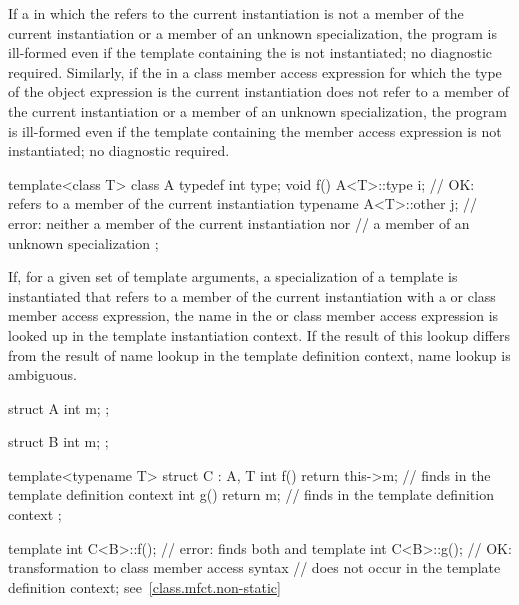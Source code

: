 \pnum
If a  in which the 
refers to the current instantiation is not a member of the current instantiation
or a member of an unknown specialization, the program is ill-formed even if the
template containing the  is not instantiated; no
diagnostic required. Similarly, if the  in a class
member access expression for which the type of the object expression is the
current instantiation does not refer to a member of the current instantiation
or a member of an unknown specialization, the program is ill-formed even if the
template containing the member access expression is not instantiated; no diagnostic
required. \begin{example}
\begin{codeblock}
template<class T> class A {
  typedef int type;
  void f() {
    A<T>::type i;               // OK: refers to a member of the current instantiation
    typename A<T>::other j;     // error: neither a member of the current instantiation nor
                                // a member of an unknown specialization
  }
};
\end{codeblock}
\end{example}

\pnum
If, for a given set of template arguments, a specialization of a template is
instantiated that refers to a member of the current instantiation with a
 or class member access expression, the name in the
 or class member access expression is looked up in the
template instantiation context. If the result of this lookup differs from the
result of name lookup in the template definition context, name lookup is
ambiguous.
\begin{example}
\begin{codeblock}
struct A {
  int m;
};

struct B {
  int m;
};

template<typename T>
struct C : A, T {
  int f() { return this->m; }   // finds  in the template definition context
  int g() { return m; }         // finds  in the template definition context
};

template int C<B>::f();         // error: finds both  and 
template int C<B>::g();         // OK: transformation to class member access syntax
                                // does not occur in the template definition context; see~\ref{class.mfct.non-static}
\end{codeblock}
\end{example}

